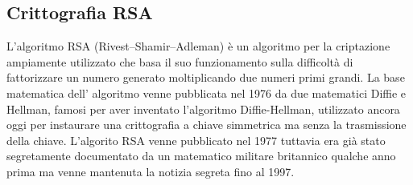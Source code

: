 \begin{itemize}
\chapter{Crittografia RSA}
L'algoritmo RSA (Rivest–Shamir–Adleman) è un algoritmo per la criptazione ampiamente utilizzato che basa il suo funzionamento sulla difficoltà di fattorizzare un numero generato moltiplicando due numeri primi grandi. La base matematica dell' algoritmo venne pubblicata nel 1976 da due matematici Diffie e Hellman, famosi per aver inventato l'algoritmo Diffie-Hellman, utilizzato ancora oggi per instaurare una crittografia a chiave simmetrica ma senza la trasmissione della chiave. L'algorito RSA venne pubblicato nel 1977 tuttavia era già stato segretamente documentato da un matematico  militare britannico qualche anno prima ma venne mantenuta la notizia segreta fino al 1997.
 

\end{itemize}

